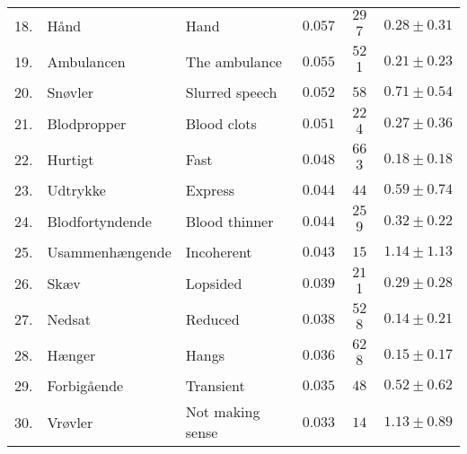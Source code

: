 {\begin{table}[h]
{\begin{tabular}{l|llccc}
        18. & Hånd & Hand & $0.057$ & $29$7 & $0.28 \pm 0.31$ \\
        19. & Ambulancen & The ambulance & $0.055$ & $52$1 & $0.21 \pm 0.23$ \\
        20. & Snøvler & Slurred speech & $0.052$ & $58$ & $0.71 \pm 0.54$ \\
        21. & Blodpropper & Blood clots & $0.051$ & $22$4 & $0.27 \pm 0.36$ \\
        22. & Hurtigt & Fast & $0.048$ & $66$3 & $0.18 \pm 0.18$ \\
        23. & Udtrykke & Express & $0.044$ & $44$ & $0.59 \pm 0.74$ \\
        24. & Blodfortyndende & Blood thinner & $0.044$ & $25$9 & $0.32 \pm 0.22$ \\
        25. & Usammenhængende & Incoherent & $0.043$ & $15$ & $1.14 \pm 1.13$ \\
        26. & Skæv & Lopsided & $0.039$ & $21$1 & $0.29 \pm 0.28$ \\
        27. & Nedsat & Reduced & $0.038$ & $52$8 & $0.14 \pm 0.21$ \\
        28. & Hænger & Hangs & $0.036$ & $62$8 & $0.15 \pm 0.17$ \\
        29. & Forbigående & Transient & $0.035$ & $48$ & $0.52 \pm 0.62$ \\
        30. & Vrøvler & Not making sense & $0.033$ & $14$ & $1.13 \pm 0.89$ \\
        \bottomrule
    \end{tabular}%
    }
\end{table}

}
